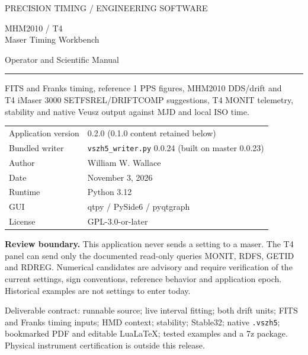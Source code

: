 \documentclass[11pt,a4paper]{article}
\newcommand{\warning}[1]{\par\noindent\colorbox{light}{\parbox{\dimexpr\linewidth-2\fboxsep}{\textbf{Review boundary.} #1}}\par}
\begin{document}
\begin{titlepage}
{\sffamily\color{teal}\large PRECISION TIMING / ENGINEERING SOFTWARE\par}
\vspace{18mm}
{\sffamily\color{navy}\Huge MHM2010 / T4\\Maser Timing Workbench\par}
\vspace{5mm}
{\sffamily\Large Operator and Scientific Manual\par}
\vspace{9mm}
\rule{\linewidth}{1pt}
\vspace{5mm}
{\large FITS and Franks timing, reference 1 PPS figures, MHM2010 DDS/drift and\\
T4 iMaser 3000 SETFSREL/DRIFTCOMP suggestions, T4 MONIT telemetry,\\
stability and native Veusz output against MJD and local ISO time.\par}
\vspace{12mm}
\begin{tabular}{@{}ll@{}}
Application version & 0.2.0 (0.1.0 content retained below)\\
Bundled writer & \texttt{vszh5\_writer.py} 0.0.24 (built on master 0.0.23)\\
Author & William W. Wallace\\
Date & November 3, 2026\\
Runtime & Python 3.12\\
GUI & qtpy / PySide6 / pyqtgraph\\
License & GPL-3.0-or-later\\
\end{tabular}
\vfill
\warning{This application never sends a setting to a maser. The T4 panel can
send only the documented read-only queries MONIT, RDFS, GETID and RDREG.
Numerical candidates are advisory and require verification of the current
settings, sign conventions, reference behavior and application epoch.
Historical examples are not settings to enter today.}
\vspace{5mm}
{\small Deliverable contract: runnable source; live interval fitting; both drift
units; FITS and Franks timing inputs; HMD context; stability; Stable32; native
\texttt{.vszh5}; bookmarked PDF and editable LuaLaTeX; tested examples and a 7z package.
Physical instrument certification is outside this release.}
\end{titlepage}
\tableofcontents
\clearpage
\end{document}
